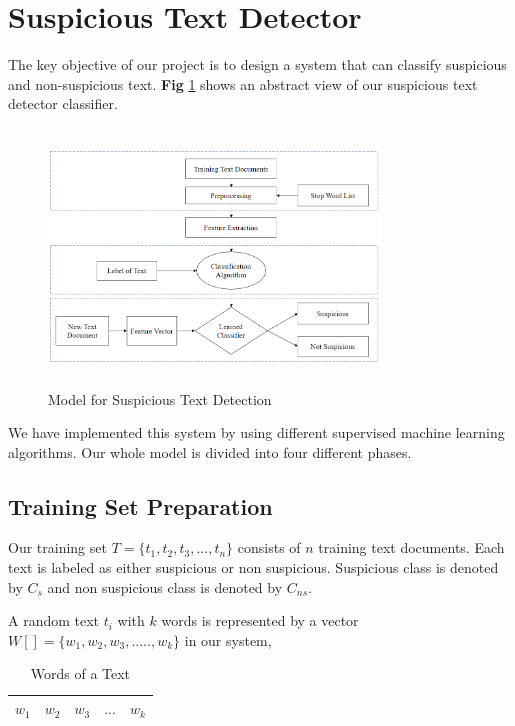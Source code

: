 \section{\textbf{Suspicious Text Detector}}
The key objective of our project is to design a system that can classify suspicious and non-suspicious text. \textbf{Fig} \ref{fig:proposed_model} shows an abstract view of our suspicious text detector classifier.

\begin{figure}[h!]
\centering
  \includegraphics[height=6.8cm, width=8.8cm]{Figures/pr_model.PNG}
  \caption{ Model for Suspicious Text Detection}
  \label{fig:proposed_model}
\end{figure}

We have implemented this system by using different supervised machine learning algorithms. Our whole model is divided into four different phases.
\subsection{\textbf {Training Set Preparation}}
Our training set $T = \{t_1, t_2, t_3, ..., t_n\}$ consists of $n$ training text documents. Each text is labeled as either suspicious or non suspicious. Suspicious class is denoted by $C_s$ and non suspicious class is denoted by $C_{ns}$.\par
A random text $t_i$ with $k$ words is represented by a vector $W[] =\{w_1, w_2, w_3, ....., w_k\}$ in our system,
\begin{table}[h!]
\begin{center}
\caption{Words of a Text}
\begin{tabular}{|m{1cm} | m{1cm}| m{1cm}|m{1cm} | m{1cm}|}
\hline
     $w_1$ & $w_2$  & $w_3$ & $...$ & $w_k$  \\
\hline
\end{tabular}
\end{center}
\end{table}

